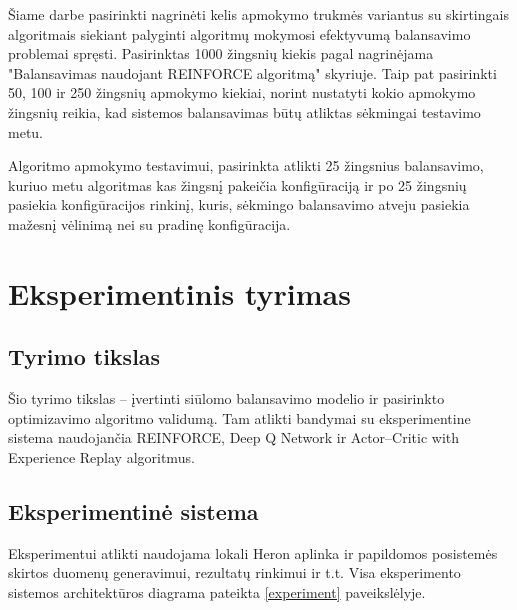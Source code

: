 \documentclass{VUMIFPSbakalaurinis}
\begin{document}
Šiame darbe pasirinkti nagrinėti kelis apmokymo trukmės variantus su skirtingais algoritmais siekiant palyginti algoritmų mokymosi efektyvumą balansavimo problemai spręsti. Pasirinktas 1000 žingsnių kiekis pagal \cite{vaquero2018autotuning} nagrinėjama "Balansavimas naudojant REINFORCE algoritmą" skyriuje. Taip pat pasirinkti 50, 100 ir 250 žingsnių apmokymo kiekiai, norint nustatyti kokio apmokymo žingsnių reikia, kad sistemos balansavimas būtų atliktas sėkmingai testavimo metu.

Algoritmo apmokymo testavimui, pasirinkta atlikti 25 žingsnius balansavimo, kuriuo metu algoritmas kas žingsnį pakeičia konfigūraciją ir po 25 žingsnių pasiekia konfigūracijos rinkinį, kuris, sėkmingo balansavimo atveju pasiekia mažesnį vėlinimą nei su pradinę konfigūracija.
\section{Eksperimentinis tyrimas}

\subsection{Tyrimo tikslas}

Šio tyrimo tikslas – įvertinti siūlomo balansavimo modelio ir pasirinkto optimizavimo algoritmo validumą. Tam atlikti bandymai su eksperimentine sistema naudojančia REINFORCE, Deep Q Network ir Actor–Critic with Experience Replay algoritmus.

\subsection{Eksperimentinė sistema}

Eksperimentui atlikti naudojama lokali Heron aplinka ir papildomos posistemės skirtos duomenų generavimui, rezultatų rinkimui ir t.t. Visa eksperimento sistemos architektūros diagrama pateikta \ref{experiment} paveikslėlyje.
\end{document}
